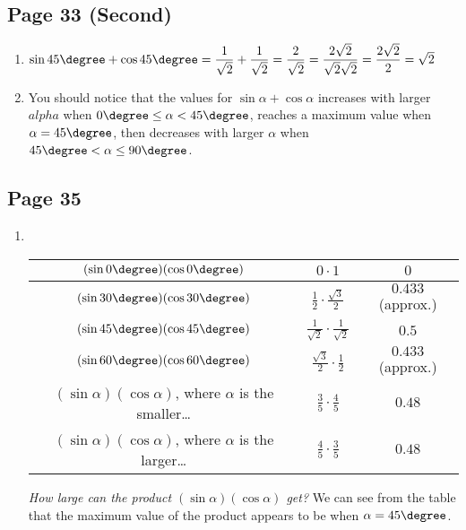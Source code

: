 \documentclass{article}
\newenvironment{solutions}[1]
{\subsection*{#1}
 \begin{enumerate}[leftmargin=1.5em]}
{\end{enumerate}}
\newcommand{\solution}{\item}
\begin{document}
\begin{solutions}{Page 33 (Second)}
\solution %
$\sin{45\degree} + \cos{45\degree} = \dfrac{1}{\sqrt{2}} + \dfrac{1}{\sqrt{2}} = \dfrac{2}{\sqrt{2}} = \dfrac{2\sqrt{2}}{\sqrt{2}\sqrt{2}} = \dfrac{2\sqrt{2}}{2} = \sqrt{2}$

\solution %
You should notice that the values for $\sin{\alpha} + \cos{\alpha}$ increases with larger $alpha$ when $0\degree \leq \alpha < 45\degree$, reaches a maximum value when $\alpha = 45\degree$, then decreases with larger $\alpha$ when $45\degree < \alpha \leq 90\degree$.

\end{solutions}

\begin{solutions}{Page 35}
\solution ~
\begin{center}
\bgroup
\def\arraystretch{2}
\setlength\tabcolsep{15pt}
\begin{tabular}{ |c|c|c| }
\hline
$(\sin{0\degree})(\cos{0\degree})$   & $0\cdot1$        & $0$ \\
\hline
$(\sin{30\degree})(\cos{30\degree})$ & $\frac{1}{2}\cdot\frac{\sqrt{3}}{2}$ & $0.433$ (approx.) \\
\hline
$(\sin{45\degree})(\cos{45\degree})$ & $\frac{1}{\sqrt{2}}\cdot\frac{1}{\sqrt{2}}$ & $0.5$ \\
\hline
$(\sin{60\degree})(\cos{60\degree})$ & $\frac{\sqrt{3}}{2}\cdot\frac{1}{2}$ & $0.433$ (approx.) \\
\hline
\makecell{$(\sin{\alpha})(\cos{\alpha})$, where $\alpha$\\ is the smaller\ldots}  & $\frac{3}{5}\cdot\frac{4}{5}$ & $0.48$ \\
\hline
\makecell{$(\sin{\alpha})(\cos{\alpha})$, where $\alpha$\\ is the larger\ldots}  & $\frac{4}{5}\cdot\frac{3}{5}$ & $0.48$ \\
\hline
\end{tabular}
\egroup
\end{center}
\textit{How large can the product $(\sin{\alpha})(\cos{\alpha})$ get?}
We can see from the table that the maximum value of the product appears to be when $\alpha = 45\degree$.
\end{solutions}
\end{document}
